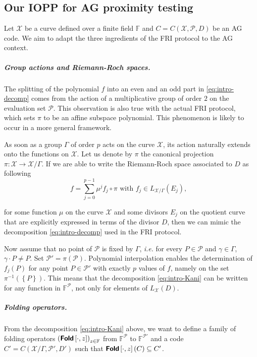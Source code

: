 \documentclass[a4paper,USenglish,autoref]{lipics-v2021}
\newcommand\F{\mathbb{F}}
\newcommand\fold[1]{\textsf{\textbf{Fold}}\left[#1\right]}
\newcommand{\set}[1]{\left\{#1\right\}}
\newcommand\calX{\mathcal{X}}
\newcommand\calP{\mathcal{P}}
\begin{document}
\subsection{Our IOPP for AG proximity testing}\label{subsec:AG-IOPP-hyp}

Let $\calX$ be a curve defined over a finite field $\F$ and $C=C(\calX,\calP,D)$ be an AG code. We aim to adapt the three ingredients of the \textsf{FRI} protocol to the AG context.

\subparagraph*{Group actions and Riemann-Roch spaces.}
The splitting of the polynomial $f$ into an even and an odd part in \eqref{eq:intro-decomp} comes from the action of a multiplicative group of order $2$ on the evaluation set $\calP$. This observation is also true with the actual \textsf{FRI} protocol, which sets $\pi$ to be an affine subspace polynomial. This phenomenon is likely to occur in a more general framework.

As soon as a group $\Gamma$ of order $p$ acts on the curve $\calX$, its action naturally extends onto the functions on $\calX$. Let us denote by $\pi$ the canonical projection $\pi : \calX \rightarrow \calX / \Gamma$. If we are able to write the Riemann-Roch space associated to $D$ as following
\begin{equation}\tag{$\star$}\label{eq:intro-Kani}
	f= \sum_{j=0}^{p-1} \mu^j f_j \circ \pi \text{ with } f_j \in L_{\calX / \Gamma}(E_j),
\end{equation}

for some function $\mu$ on the curve $\calX$ and some divisors $E_j$ on the quotient curve that are explicitly expressed in terms of the divisor $D$, then we can mimic the decomposition \eqref{eq:intro-decomp} used in the \textsf{FRI} protocol.


Now assume that no point of $\calP$ is fixed by $\Gamma$, \textit{i.e.} for every $P \in \calP$ and $\gamma \in \Gamma$, $\gamma \cdot P \neq P$. Set $\calP'=\pi(\calP)$.
Polynomial interpolation enables the determination of $f_j(P)$ for any point $P \in \calP'$ with exactly $p$ values of $f$, namely on the set $\pi^{-1}(\set{P})$. This means that the decomposition \eqref{eq:intro-Kani} can be written for any function in $\F^\calP$, not only for elements of $L_\calX(D)$.


\subparagraph*{Folding operators.}
From the decomposition \eqref{eq:intro-Kani} above, we want to define a family of folding operators $\left(\fold{\cdot,z}\right)_{z \in \F}$ from $\F^\calP$ to $\F^{\calP'}$ and a code $C'=C(\calX/\Gamma,\calP',D')$ such that ${\fold{\cdot,z}(C) \subseteq C'}$.
\end{document}
